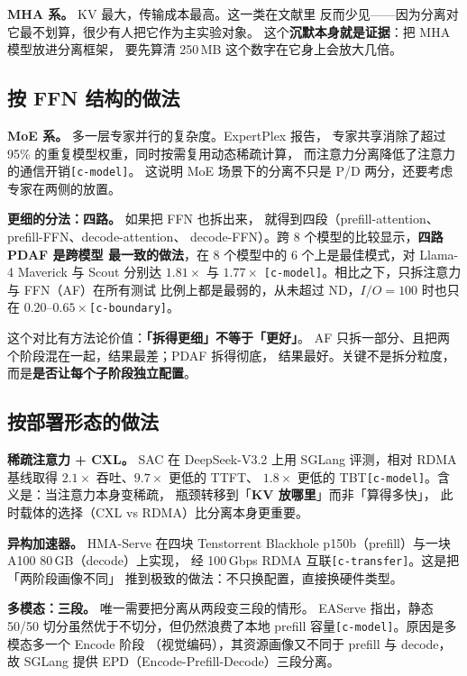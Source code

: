 \noindent\textbf{MHA 系。} KV 最大，传输成本最高。这一类在文献里
反而少见——因为分离对它最不划算，很少有人把它作为主实验对象。
这个\textbf{沉默本身就是证据}：把 MHA 模型放进分离框架，
要先算清 250\,MB 这个数字在它身上会放大几倍。

\subsection{按 FFN 结构的做法}

\noindent\textbf{MoE 系。} 多一层专家并行的复杂度。ExpertPlex 报告，
专家共享消除了超过 95\% 的重复模型权重，同时按需复用动态稀疏计算，
而注意力分离降低了注意力的通信开销\texttt{[c-model]}。
这说明 MoE 场景下的分离不只是 P/D 两分，还要考虑专家在两侧的放置。

\noindent\textbf{更细的分法：四路。} 如果把 FFN 也拆出来，
就得到四段（prefill-attention、prefill-FFN、decode-attention、
decode-FFN）。跨 8 个模型的比较显示，\textbf{四路 PDAF 是跨模型
最一致的做法}，在 8 个模型中的 6 个上是最佳模式，对 Llama-4
Maverick 与 Scout 分别达 $1.81\times$ 与 $1.77\times$
\texttt{[c-model]}。相比之下，只拆注意力与 FFN（AF）在所有测试
比例上都是最弱的，从未超过 ND，$I/O=100$ 时也只在
$0.20$--$0.65\times$\texttt{[c-boundary]}。

这个对比有方法论价值：\textbf{「拆得更细」不等于「更好」}。
AF 只拆一部分、且把两个阶段混在一起，结果最差；PDAF 拆得彻底，
结果最好。关键不是拆分粒度，而是\textbf{是否让每个子阶段独立配置}。

\subsection{按部署形态的做法}

\noindent\textbf{稀疏注意力 + CXL。} SAC 在 DeepSeek-V3.2 上用 SGLang
评测，相对 RDMA 基线取得 $2.1\times$ 吞吐、$9.7\times$ 更低的 TTFT、
$1.8\times$ 更低的 TBT\texttt{[c-model]}。含义是：当注意力本身变稀疏，
瓶颈转移到「\textbf{KV 放哪里}」而非「算得多快」，
此时载体的选择（CXL vs RDMA）比分离本身更重要。

\noindent\textbf{异构加速器。} HMA-Serve 在四块 Tenstorrent Blackhole
p150b（prefill）与一块 A100 80\,GB（decode）上实现，
经 100\,Gbps RDMA 互联\texttt{[c-transfer]}。这是把「两阶段画像不同」
推到极致的做法：不只换配置，直接换硬件类型。

\noindent\textbf{多模态：三段。} 唯一需要把分离从两段变三段的情形。
EAServe 指出，静态 50/50 切分虽然优于不切分，但仍然浪费了本地
prefill 容量\texttt{[c-model]}。原因是多模态多一个 Encode 阶段
（视觉编码），其资源画像又不同于 prefill 与 decode，
故 SGLang 提供 EPD（Encode-Prefill-Decode）三段分离。

